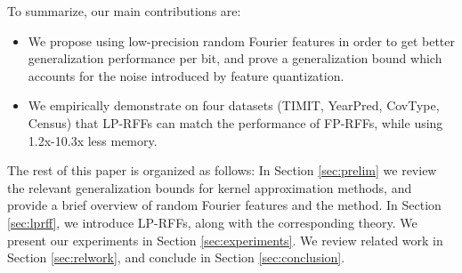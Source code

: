 
To summarize, our main contributions are:
\begin{itemize}
	\item We propose using low-precision random Fourier features in order to get better generalization performance per bit, and prove a generalization bound which accounts for the noise introduced by feature quantization.
	\item We empirically demonstrate on four datasets (TIMIT, YearPred, CovType, Census) that LP-RFFs can match the performance of FP-RFFs, while using 1.2x-10.3x less memory.
\end{itemize}

The rest of this paper is organized as follows: In Section \ref{sec:prelim} we review the relevant generalization bounds for kernel approximation methods, and provide a brief overview of random Fourier features and the \Nystrom method.  In Section \ref{sec:lprff}, we introduce LP-RFFs, along with the corresponding theory. We present our experiments in Section \ref{sec:experiments}.  We review related work in Section \ref{sec:relwork}, and conclude in Section \ref{sec:conclusion}.









